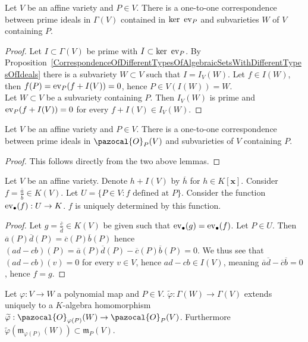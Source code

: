 \begin{lemma}
    Let $V$ be an affine variety and $P\in V$. There is a one-to-one correspondence between prime ideals in $\Gamma(V)$ contained in $\ker\ \mathrm{ev}_P$ and subvarieties $W$ of $V$ containing $P$.
\end{lemma}
\begin{proof}
    Let $I\subset \Gamma(V)$ be prime with $I\subset \ker \ \mathrm{ev}_P$. By Proposition~\ref{CorrespondenceOfDifferentTypesOfAlgebraicSetsWithDifferentTypesOfIdeals} there is a subvariety $W\subset V$ such that $I=I_V(W)$. Let $f\in I(W)$, then $f(P)=\mathrm{ev}_P(f+I(V))=0$, hence $P\in V(I(W))=W$.\\
    Let $W\subset V$ be a subvariety containing $P$. Then $I_V(W)$ is prime and $\mathrm{ev}_P(f+I(V))=0$ for every $f+I(V)\in I_V(W)$.
\end{proof}
\begin{proposition}
    Let $V$ be an affine variety and $P\in V$. There is a one-to-one correspondence between prime ideals in $\pazocal{O}_P(V)$ and subvarieties of $V$ containing $P$. 
\end{proposition}
\begin{proof}
    This follows directly from the two above lemmas. 
\end{proof}
\begin{proposition}
    Let $V$ be an affine variety. Denote $h+I(V)$ by $\overline{h}$ for $h\in K[\mathbf{x}]$. Consider $f=\frac{\overline{a}}{\overline{b}}\in K(V)$. Let $U=\{ P\in V: f \text{ defined at } P \}$. Consider the function $\mathrm{ev}_\bullet(f) : U \rightarrow K$. $f$ is uniquely determined by this function.\\
\end{proposition}
\begin{proof}
    Let $g=\frac{\overline{c}}{\overline{d}}\in K(V)$ be given such that $\mathrm{ev}_\bullet(g)=\mathrm{ev}_\bullet(f)$. Let $P\in U$. Then $\overline{a}(P)\overline{d}(P)=\overline{c}(P)\overline{b}(P)$ hence $(ad-cb)(P)=\overline{a}(P)\overline{d}(P)-\overline{c}(P)\overline{b}(P)=0$. We thus see that $(ad-cb)(v)=0$ for every $v\in V$, hence $ad-cb\in I(V)$, meaning $\overline{a}\overline{d}-\overline{c}\overline{b}=0$, hence $f=g$.
\end{proof}
\begin{proposition}
    Let $\varphi : V\rightarrow W$ a polynomial map and $P\in V$. $\widetilde{\varphi}:\Gamma(W)\rightarrow \Gamma(V)$ extends uniquely to a $K$-algebra homomorphism $\widetilde{\varphi} : \pazocal{O}_{\varphi(P)}(W)\rightarrow \pazocal{O}_P(V)$. Furthermore $\widetilde{\varphi}(\mathfrak{m}_{\varphi(P)}(W))\subset \mathfrak{m}_P(V).$
\end{proposition}
